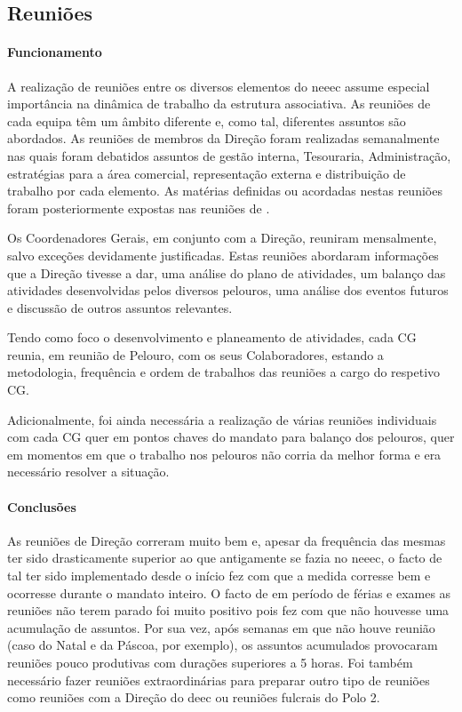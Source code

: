 
\subsection{Reuniões}

\paragraph{Funcionamento}

A realização de reuniões entre os diversos elementos do \acrshort{neeec} assume especial importância na dinâmica de trabalho da estrutura associativa. As reuniões de cada equipa têm um âmbito diferente e, como tal, diferentes assuntos são abordados. As reuniões de membros da Direção foram realizadas semanalmente nas quais foram debatidos assuntos de gestão interna, Tesouraria, Administração, estratégias para a área comercial, representação externa e distribuição de trabalho por cada elemento. As matérias definidas ou acordadas nestas reuniões foram posteriormente expostas nas reuniões de .

Os Coordenadores Gerais, em conjunto com a Direção, reuniram mensalmente, salvo exceções devidamente justificadas. Estas reuniões abordaram informações que a Direção tivesse a dar, uma análise do plano de atividades, um balanço das atividades desenvolvidas pelos diversos pelouros, uma análise dos eventos futuros e discussão de outros assuntos relevantes.

Tendo como foco o desenvolvimento e planeamento de atividades, cada CG reunia, em reunião de Pelouro, com os seus Colaboradores, estando a metodologia, frequência e ordem de trabalhos das reuniões a cargo do respetivo CG.

Adicionalmente, foi ainda necessária a realização de várias reuniões individuais com cada CG quer em pontos chaves do mandato para balanço dos pelouros, quer em momentos em que o trabalho nos pelouros não corria da melhor forma e era necessário resolver a situação.

\paragraph{Conclusões}

As reuniões de Direção correram muito bem e, apesar da frequência das mesmas ter sido drasticamente superior ao que antigamente se fazia no \acrshort{neeec}, o facto de tal ter sido implementado desde o início fez com que a medida corresse bem e ocorresse durante o mandato inteiro. O facto de em período de férias e exames as reuniões não terem parado foi muito positivo pois fez com que não houvesse uma acumulação de assuntos. Por sua vez, após semanas em que não houve reunião (caso do Natal e da Páscoa, por exemplo), os assuntos acumulados provocaram reuniões pouco produtivas com durações superiores a 5 horas. Foi também necessário fazer reuniões extraordinárias para preparar outro tipo de reuniões como reuniões com a Direção do \acrshort{deec} ou reuniões fulcrais do Polo 2.

